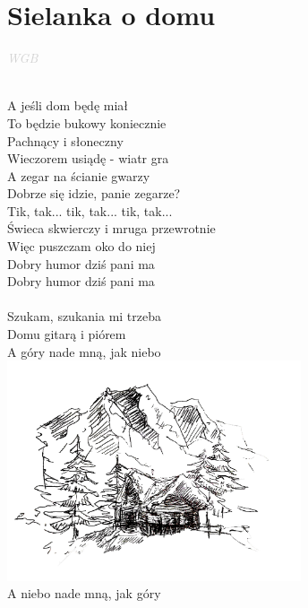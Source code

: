 \documentclass[a5paper, 10pt]{book}
\begin{document}
\section{Sielanka o domu}\textcolor{lightgray}{\textit{WGB}}\\~\\
\begin{minipage}[t]{0.65\textwidth}
  A jeśli dom będę miał\\
  To będzie bukowy koniecznie\\
  Pachnący i słoneczny\\
  Wieczorem usiądę - wiatr gra\\
  A zegar na ścianie gwarzy\\
  Dobrze się idzie, panie zegarze?\\
  Tik, tak... tik, tak... tik, tak...\\
  Świeca skwierczy i mruga przewrotnie\\
  Więc puszczam oko do niej\\
  Dobry humor dziś pani ma\\
  Dobry humor dziś pani ma\\
  \\
  \hspace*{6mm}Szukam, szukania mi trzeba\\
  \hspace*{6mm}Domu gitarą i piórem\\
  \hspace*{6mm}A góry nade mną, jak niebo\\
  \hspace*{5.5cm}\includegraphics[height=6.5cm]{images/sielanka_o_domu.png}\vspace*{-6.6cm}\\
  \hspace*{6mm}A niebo nade mną, jak góry\\
  \\

\end{minipage}
\end{document}
